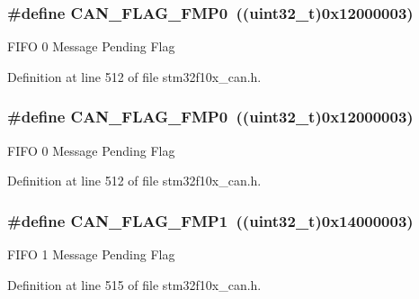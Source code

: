 \subsubsection[{\texorpdfstring{C\+A\+N\+\_\+\+F\+L\+A\+G\+\_\+\+F\+M\+P0}{CAN_FLAG_FMP0}}]{\setlength{\rightskip}{0pt plus 5cm}\#define C\+A\+N\+\_\+\+F\+L\+A\+G\+\_\+\+F\+M\+P0~(({\bf uint32\+\_\+t})0x12000003)}\hypertarget{group___c_a_n__flags_ga4b40574700edfe752433bb4e0d457c64}{}\label{group___c_a_n__flags_ga4b40574700edfe752433bb4e0d457c64}
F\+I\+FO 0 Message Pending Flag 

Definition at line 512 of file stm32f10x\+\_\+can.\+h.

\subsubsection[{\texorpdfstring{C\+A\+N\+\_\+\+F\+L\+A\+G\+\_\+\+F\+M\+P0}{CAN_FLAG_FMP0}}]{\setlength{\rightskip}{0pt plus 5cm}\#define C\+A\+N\+\_\+\+F\+L\+A\+G\+\_\+\+F\+M\+P0~(({\bf uint32\+\_\+t})0x12000003)}\hypertarget{group___c_a_n__flags_ga4b40574700edfe752433bb4e0d457c64}{}\label{group___c_a_n__flags_ga4b40574700edfe752433bb4e0d457c64}
F\+I\+FO 0 Message Pending Flag 

Definition at line 512 of file stm32f10x\+\_\+can.\+h.

\subsubsection[{\texorpdfstring{C\+A\+N\+\_\+\+F\+L\+A\+G\+\_\+\+F\+M\+P1}{CAN_FLAG_FMP1}}]{\setlength{\rightskip}{0pt plus 5cm}\#define C\+A\+N\+\_\+\+F\+L\+A\+G\+\_\+\+F\+M\+P1~(({\bf uint32\+\_\+t})0x14000003)}\hypertarget{group___c_a_n__flags_ga5d4b7376954a059fbd74ed8d688f6657}{}\label{group___c_a_n__flags_ga5d4b7376954a059fbd74ed8d688f6657}
F\+I\+FO 1 Message Pending Flag 

Definition at line 515 of file stm32f10x\+\_\+can.\+h.

